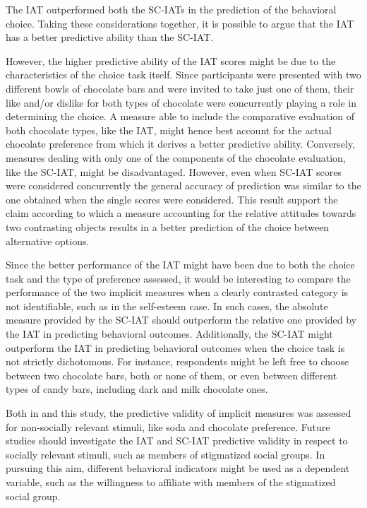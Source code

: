 \documentclass[12pt]{book}
\begin{document}
The IAT outperformed both the SC-IATs in the prediction of the behavioral choice. 
Taking these considerations together, it is possible to argue that the IAT has a better predictive ability than the SC-IAT. 

However, the higher predictive ability of the IAT scores might be due to the characteristics of the choice task itself. 
Since participants were presented with two different bowls of chocolate bars and were invited to take just one of them, their like and/or dislike for both types of chocolate were concurrently playing a role in determining the choice. A measure able to include the comparative evaluation of both chocolate types, like the IAT, might hence best account for the actual chocolate preference from which it derives a better predictive ability. 
Conversely,  measures dealing with only one of the components of the chocolate evaluation, like the SC-IAT, might be disadvantaged. 
However, even when SC-IAT scores were considered concurrently the general accuracy of prediction was similar to the one obtained when the single scores were considered. 
This result support the claim according to which a measure accounting for the relative attitudes towards two contrasting objects results in a better prediction of the choice between alternative options.

Since the better performance of the IAT might have been due to both the choice task and the type of preference assessed, it would be interesting to compare the performance of the two implicit measures when a clearly contrasted category is not identifiable, such as in the self-esteem case.
In such cases, the absolute measure provided by the SC-IAT should outperform the relative one provided by the IAT in predicting behavioral outcomes.
Additionally, the SC-IAT might outperform the IAT in predicting behavioral outcomes when the choice task is not strictly dichotomous. 
For instance, respondents might be left free to choose between two chocolate bars, both or none of them, or even between different types of candy bars, including dark and milk chocolate ones.

Both in  and this study, the predictive validity of implicit measures was assessed for non-socially relevant stimuli, like soda and chocolate preference. Future studies should investigate the IAT and SC-IAT predictive validity in respect to socially relevant stimuli, such as members of stigmatized social groups. 
In pursuing this aim, different behavioral indicators might be used as a dependent variable, such as the willingness to affiliate with members of the stigmatized social group. 
\end{document}
